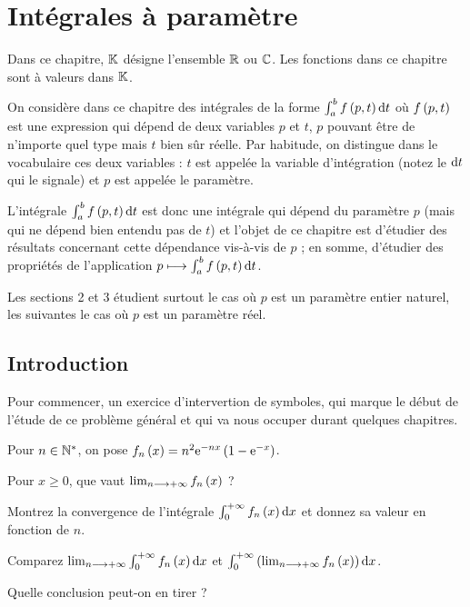 \chapter{Intégrales à paramètre}

\minitoc

Dans ce chapitre, \(\mathbb{K}\) désigne l'ensemble \(\mathbb{R}\) ou \(\mathbb{C}\). Les fonctions dans ce chapitre sont à valeurs dans \(\mathbb{K}\).

On considère dans ce chapitre des intégrales de la forme \(\int_a^bf\paren{p,t}\odif{t}\) où \(f\left(p,t\right)\) est une expression qui dépend de deux variables \(p\) et \(t\), \(p\) pouvant être de n'importe quel type mais \(t\) bien sûr réelle. Par habitude, on distingue dans le vocabulaire ces deux variables : \(t\) est appelée la variable d'intégration (notez le \(\odif{t}\) qui le signale) et \(p\) est appelée le paramètre.

L'intégrale \(\int_a^bf\paren{p,t}\odif{t}\) est donc une intégrale qui dépend du paramètre \(p\) (mais qui ne dépend bien entendu pas de \(t\)) et l'objet de ce chapitre est d'étudier des résultats concernant cette dépendance vis-à-vis de \(p\) ; en somme, d'étudier des propriétés de l'application \(p\mapsto\int_a^bf\paren{p,t}\odif{t}\).

Les sections 2 et 3 étudient surtout le cas où \(p\) est un paramètre entier naturel, les suivantes le cas où \(p\) est un paramètre réel.

\section{Introduction}

Pour commencer, un exercice d'intervertion de symboles, qui marque le début de l'étude de ce problème général et qui va nous occuper durant quelques chapitres.

\begin{exo}
Pour \(n\in\mathbb{N}^*\), on pose \(f_n\left(x\right)=n^2\mathrm{e}^{-nx}\left(1-\mathrm{e}^{-x}\right)\).

Pour \(x\geq0\), que vaut \(\lim_{n\longrightarrow+\infty}f_n\left(x\right)\) ?

Montrez la convergence de l'intégrale \(\int_0^{\pinf}f_n\paren{x}\odif{x}\) et donnez sa valeur en fonction de \(n\).

Comparez \(\lim_{n\to\pinf}\int_0^{\pinf}f_n\paren{x}\odif{x}\) et \(\int_0^{\pinf}\paren{\lim_{n\to\pinf}f_n\paren{x}}\odif{x}\).

Quelle conclusion peut-on en tirer ?
\end{exo}

